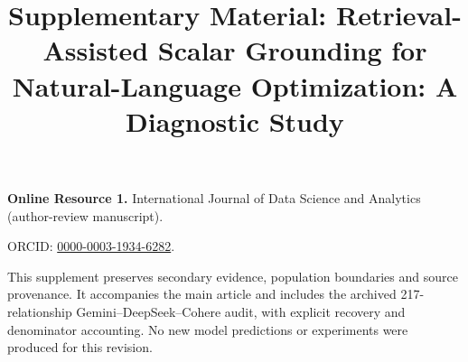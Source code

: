 \documentclass[pdflatex,sn-basic,Numbered]{sn-jnl}
\begin{document}
\title[Supplement: Scalar Grounding]{Supplementary Material: Retrieval-Assisted Scalar Grounding for Natural-Language Optimization: A Diagnostic Study}
\author*[1]{ }
\maketitle
\renewcommand{\thesection}{S\arabic{section}}
\renewcommand{\thetable}{S\arabic{table}}
\renewcommand{\thefigure}{S\arabic{figure}}
\renewcommand{\theequation}{S\arabic{equation}}
\noindent\textbf{Online Resource 1.} International Journal of Data Science and Analytics (author-review manuscript).\par
\noindent ORCID: \href{https://orcid.org/0000-0003-1934-6282}{0000-0003-1934-6282}.\par

This supplement preserves secondary evidence, population boundaries and source provenance. It accompanies the main article and includes the archived 217-relationship Gemini--DeepSeek--Cohere audit, with explicit recovery and denominator accounting. No new model predictions or experiments were produced for this revision.
\end{document}

